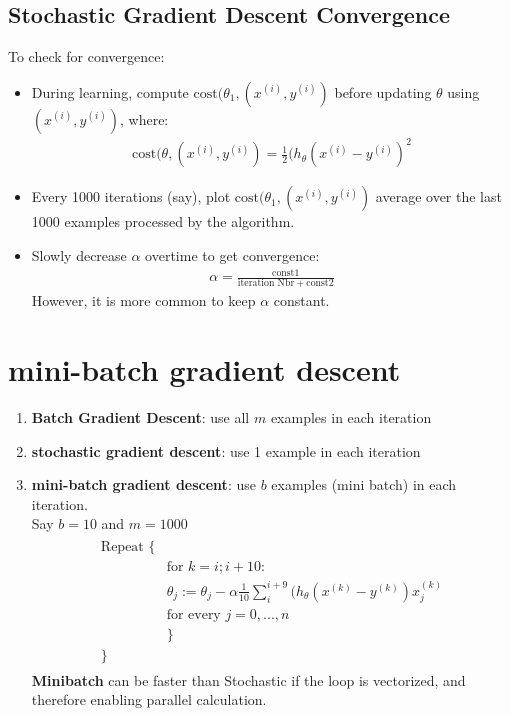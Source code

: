 \documentclass[a4paper,12pt]{report}
\begin{document}
\subsection{Stochastic Gradient Descent Convergence}
To check for convergence:
\begin{itemize}
\item During learning, compute $\text{cost}(\theta_1, (x^{(i)}, y^{(i)})$ before updating $\theta$ using $(x^{(i)}, y^{(i)})$, where:
\begin{align}
\text{cost}(\theta, (x^{(i)}, y^{(i)}) = \frac{1}{2} (h_{\theta}(x^{(i)} - y^{(i)})^2
\end{align}
\item Every 1000 iterations (say), plot  $\text{cost}(\theta_1, (x^{(i)}, y^{(i)})$ average over the last 1000 examples processed by the algorithm. \\
\item Slowly decrease $\alpha$ overtime to get convergence:
\begin{align}
\alpha = \frac{\text{const}1}{\text{iteration \ Nbr} + \text{const}2}
\end{align}
However, it is more common to keep $\alpha$ constant.
\end{itemize}

\section{mini-batch gradient descent}
\begin{enumerate}
\item \textbf{Batch Gradient Descent}: use all $m$ examples in each iteration \\
\item \textbf{stochastic gradient descent}: use 1 example in each iteration \\
\item \textbf{mini-batch gradient descent}: use $b$ examples (mini batch) in each iteration. \\
Say $b=10$ and $m=1000$ \\
\begin{align}
\begin{split}
\text{Repeat \{ } &  \\
& \text{for \ } k= i; i+10: \\
& \theta_j := \theta_j - \alpha \frac{1}{10} \sum_{i} ^{i+9} (h_{\theta}(x^{(k)} - y^{(k)}) x_j ^{(k)} \\
& \text{for \ every \ } j=0, ..., n \\
& \} \\
\} &
\end{split}
\end{align}
\textbf{Minibatch} can be faster than Stochastic if the loop is vectorized, and therefore enabling parallel calculation.
\end{enumerate}
\end{document}
